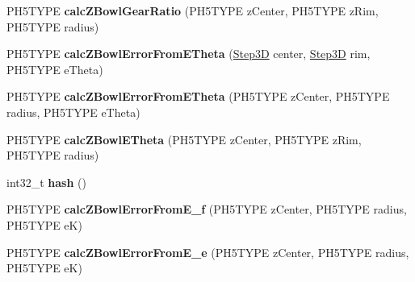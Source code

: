\begin{DoxyCompactItemize}
\item 
\hypertarget{classfirestep_1_1_delta_calculator_a5707c28cdbdd2390fdc3797f8778ed09}{P\+H5\+T\+Y\+P\+E {\bfseries calc\+Z\+Bowl\+Gear\+Ratio} (P\+H5\+T\+Y\+P\+E z\+Center, P\+H5\+T\+Y\+P\+E z\+Rim, P\+H5\+T\+Y\+P\+E radius)}\label{classfirestep_1_1_delta_calculator_a5707c28cdbdd2390fdc3797f8778ed09}

\item 
\hypertarget{classfirestep_1_1_delta_calculator_a99212212859547a11c99f9aa60098925}{P\+H5\+T\+Y\+P\+E {\bfseries calc\+Z\+Bowl\+Error\+From\+E\+Theta} (\hyperlink{classfirestep_1_1_step3_d}{Step3\+D} center, \hyperlink{classfirestep_1_1_step3_d}{Step3\+D} rim, P\+H5\+T\+Y\+P\+E e\+Theta)}\label{classfirestep_1_1_delta_calculator_a99212212859547a11c99f9aa60098925}

\item 
\hypertarget{classfirestep_1_1_delta_calculator_af0daac3f05ac08a412b06b17cea2d385}{P\+H5\+T\+Y\+P\+E {\bfseries calc\+Z\+Bowl\+Error\+From\+E\+Theta} (P\+H5\+T\+Y\+P\+E z\+Center, P\+H5\+T\+Y\+P\+E radius, P\+H5\+T\+Y\+P\+E e\+Theta)}\label{classfirestep_1_1_delta_calculator_af0daac3f05ac08a412b06b17cea2d385}

\item 
\hypertarget{classfirestep_1_1_delta_calculator_a56a91e4b3be8a0c758a255620ccc590c}{P\+H5\+T\+Y\+P\+E {\bfseries calc\+Z\+Bowl\+E\+Theta} (P\+H5\+T\+Y\+P\+E z\+Center, P\+H5\+T\+Y\+P\+E z\+Rim, P\+H5\+T\+Y\+P\+E radius)}\label{classfirestep_1_1_delta_calculator_a56a91e4b3be8a0c758a255620ccc590c}

\item 
\hypertarget{classfirestep_1_1_delta_calculator_a17812a2d20bb5d2b4548f9b7a3d964ee}{int32\+\_\+t {\bfseries hash} ()}\label{classfirestep_1_1_delta_calculator_a17812a2d20bb5d2b4548f9b7a3d964ee}

\item 
\hypertarget{classfirestep_1_1_delta_calculator_a11c0c26c388c93d420f601c58d79e33e}{P\+H5\+T\+Y\+P\+E {\bfseries calc\+Z\+Bowl\+Error\+From\+E\+\_\+f} (P\+H5\+T\+Y\+P\+E z\+Center, P\+H5\+T\+Y\+P\+E radius, P\+H5\+T\+Y\+P\+E e\+K)}\label{classfirestep_1_1_delta_calculator_a11c0c26c388c93d420f601c58d79e33e}

\item 
\hypertarget{classfirestep_1_1_delta_calculator_a44441778f306258368f67a39a596f4fa}{P\+H5\+T\+Y\+P\+E {\bfseries calc\+Z\+Bowl\+Error\+From\+E\+\_\+e} (P\+H5\+T\+Y\+P\+E z\+Center, P\+H5\+T\+Y\+P\+E radius, P\+H5\+T\+Y\+P\+E e\+K)}\label{classfirestep_1_1_delta_calculator_a44441778f306258368f67a39a596f4fa}


\end{DoxyCompactItemize}
